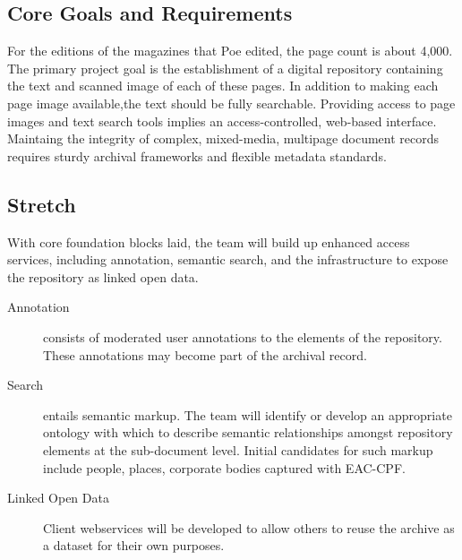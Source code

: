 \subsection{Core Goals and Requirements}
For the editions of the magazines that Poe edited, the page count is about 4,000. The primary project goal is the establishment of a digital repository containing the text and scanned image of each of these pages. In addition to making each page image available,the text should be fully searchable. Providing access to page images and text search tools implies an access-controlled, web-based interface. Maintaing the integrity of complex, mixed-media, multipage document records requires sturdy archival frameworks and flexible metadata standards. 


\subsection{Stretch}
With core foundation blocks laid, the team will build up enhanced access services, including annotation, semantic search, and the infrastructure to expose the repository as linked open data. 
\begin{description}
  \item[Annotation] consists of moderated user annotations to the elements of the repository. These annotations may become part of the archival record.   
  \item[Search] entails semantic markup. The team will identify or develop an appropriate ontology with which to describe semantic relationships amongst repository elements at the sub-document level. Initial candidates for such markup include people, places, corporate bodies captured with EAC-CPF. 
  \item[Linked Open Data] Client webservices will be developed  to allow others to reuse the archive as a dataset for their own purposes. 
\end{description}